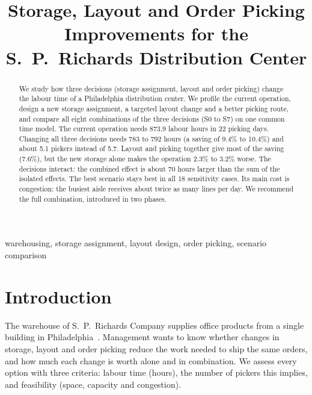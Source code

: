 \documentclass[conference]{IEEEtran}
\begin{document}
\pagestyle{plain}
\raggedbottom\setlength{\textfloatsep}{6pt}\setlength{\floatsep}{6pt}

\title{Storage, Layout and Order Picking Improvements for the S.~P.~Richards Distribution Center}

\author{
}

\maketitle
\thispagestyle{plain}

\begin{abstract}
We study how three decisions (storage assignment, layout and order picking) change the labour time of a Philadelphia distribution center. We profile the current operation, design a new storage assignment, a targeted layout change and a better picking route, and compare all eight combinations of the three decisions (S0 to S7) on one common time model. The current operation needs 873.9 labour hours in 22 picking days. Changing all three decisions needs 783 to 792 hours (a saving of 9.4\% to 10.4\%) and about 5.1 pickers instead of 5.7. Layout and picking together give most of the saving (7.6\%), but the new storage alone makes the operation 2.3\% to 3.2\% worse. The decisions interact: the combined effect is about 70 hours larger than the sum of the isolated effects. The best scenario stays best in all 18 sensitivity cases. Its main cost is congestion: the busiest aisle receives about twice as many lines per day. We recommend the full combination, introduced in two phases.
\end{abstract}

\begin{IEEEkeywords}
warehousing, storage assignment, layout design, order picking, scenario comparison
\end{IEEEkeywords}

\section{Introduction}
The warehouse of S.~P.~Richards Company supplies office products from a single building in Philadelphia~\cite{spr}. Management wants to know whether changes in storage, layout and order picking reduce the work needed to ship the same orders, and how much each change is worth alone and in combination. We assess every option with three criteria: labour time (hours), the number of pickers this implies, and feasibility (space, capacity and congestion).
\end{document}
